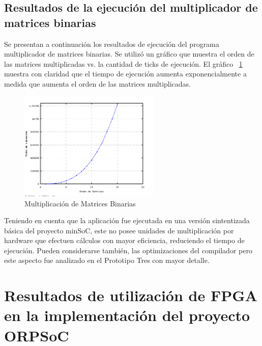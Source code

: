\newpage
		\subsection{Resultados de la ejecución del multiplicador de matrices binarias}
		Se presentan a continuación los resultados de ejecución del programa multiplicador de matrices binarias. Se utilizó un gráfico que muestra el orden
		de las matrices multiplicadas vs. la cantidad de ticks de ejecución. El gráfico ~\ref{fig:mulmat} muestra con claridad que el tiempo de ejecución
		aumenta exponencialmente a medida que aumenta el orden de las matrices multiplicadas.  
		
\begin{figure}[h!]
 	\begin{center}
  	\includegraphics[width=0.6\textwidth,keepaspectratio=true]{./images/matrices}
  	\caption{Multiplicación de Matrices Binarias}
  	\label{fig:mulmat}
 	\end{center}
	\end{figure}

		Teniendo en cuenta que la aplicación fue ejecutada en una versión sintentizada básica del proyecto minSoC, este no posee unidades de multiplicación
		por hardware que efectuen cálculos con mayor eficiencia, reduciendo el tiempo de ejecución. Pueden considerarse también, las optimizaciones del
		compilador pero este aspecto fue analizado en el Prototipo Tres con mayor detalle. 
		
\newpage
	\section{Resultados de utilización de FPGA en la implementación del proyecto ORPSoC}
		

